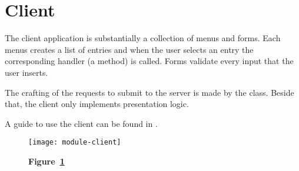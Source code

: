\section{Client}\label{sec:client}

The client application is substantially a collection of menus and forms. Each
menus creates a list of entries and when the user selects an entry the
corresponding handler (a method) is called. Forms validate every input that the
user inserts.

The crafting of the requests to submit to the server is made by the
 class. Beside that, the client only implements presentation
logic.

A guide to use the client can be found in .

\begin{landscape}
	\begin{figure}[!ht]
		\texttt{[image: module-client]}
		\caption*{\textbf{Figure~\ref{fig:client}}}
		\captionlistentry{}\label{fig:client}
	\end{figure}
\end{landscape}
